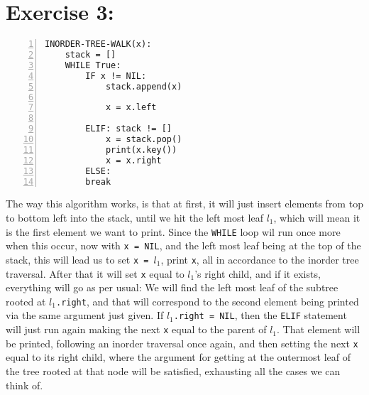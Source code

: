 \documentclass{article}
\begin{document}
\section*{Exercise 3:}
\begin{lstlisting}[numbers = left]
INORDER-TREE-WALK(x):
    stack = []
    WHILE True:
        IF x != NIL:
            stack.append(x)

            x = x.left

        ELIF: stack != []
            x = stack.pop()
            print(x.key())
            x = x.right
        ELSE:
        break
\end{lstlisting}
The way this algorithm works, is that at first, it will just insert 
elements from top to bottom left into the stack, until we hit the left
most leaf $l_{1}$, which will mean it is the first element we want to print. 
Since the \texttt{WHILE} loop wil run once more when this occur, now 
with \texttt{x = NIL}, and the left most leaf being at the top of the 
stack, this will lead us to set  \texttt{x = $l_1$}, print \texttt{x},
all in accordance to the inorder tree traversal. After that it will set 
 \texttt{x} equal to $l_1$'s right child, and if it exists, everything 
 will go as per usual: We will find the left most leaf of the subtree
 rooted at $l_1$\texttt{.right},  and that will correspond to the second 
 element being printed via the same argument just given. 
\bigskip  \newline
\noindent If $l_1$\texttt{.right = NIL}, then the \texttt{ELIF} statement will 
 just run again making the next \texttt{x} equal to the parent of $l_1$. 
 That element will be printed, following an inorder traversal once again, 
 and then setting the next \texttt{x} equal to its right child, where 
 the argument for getting at the outermost leaf of the tree rooted at 
 that node will be satisfied, exhausting all the cases we can think of. 
 
\end{document}
